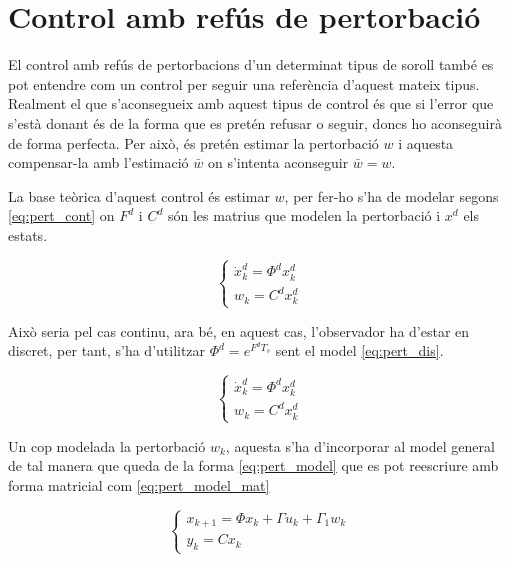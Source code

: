 \documentclass[12pt,a4paper,final,twoside,openright]{report}
\begin{document}
\section{Control amb refús de pertorbació}

El control amb refús de pertorbacions d'un determinat tipus de soroll també es pot entendre com un control per seguir una referència d'aquest mateix tipus. Realment el que s'aconsegueix amb aquest tipus de control és que si l'error que s'està donant és de la forma que es pretén refusar o seguir, doncs ho aconseguirà de forma perfecta. Per això, és pretén estimar la pertorbació $w$ i aquesta compensar-la amb l'estimació $\bar{w}$ on s'intenta aconseguir $\bar{w}=w$.

La base teòrica d'aquest control és estimar $w$, per fer-ho s'ha de modelar segons \eqref{eq:pert_cont} on $F^d$ i $C^d$ són les matrius que modelen la pertorbació i $x^d$ els estats. 

\begin{equation}\label{eq:pert_cont}
\left\{
\begin{array}{lr}
\dot{x}^d_k = \Phi^d x^d_k\\
w_k=C^d x^d_k
\end{array}
\right.
\end{equation}

Això seria pel cas continu, ara bé, en aquest cas, l'observador ha d'estar en discret, per tant, s'ha d'utilitzar $\Phi^d=e^{F^d T_s}$ sent el model \eqref{eq:pert_dis}.

\begin{equation}\label{eq:pert_dis}
\left\{
\begin{array}{lr}
\dot{x}^d_k = \Phi^d x^d_k\\
w_k=C^d x^d_k
\end{array}
\right.
\end{equation}

Un cop modelada la pertorbació $w_k$, aquesta s'ha d'incorporar al model general de tal manera que queda de la forma \eqref{eq:pert_model} que es pot reescriure amb forma matricial com \eqref{eq:pert_model_mat}

\begin{equation}\label{eq:pert_model}
\left\{
\begin{array}{lr}
x_{k+1} = \Phi x_k + \Gamma u_k + \Gamma_1 w_k\\
y_k=C x_k
\end{array}
\right.
\end{equation}
\end{document}
